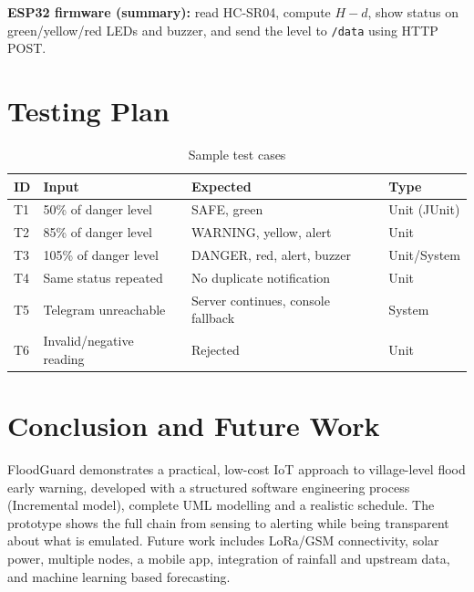 \documentclass[12pt,a4paper]{article}
\begin{document}
\textbf{ESP32 firmware (summary):} read HC-SR04, compute $H-d$, show status on green/yellow/red LEDs and buzzer, and send the level to \texttt{/data} using HTTP POST.

\section{Testing Plan}
\begin{table}[H]\centering\small
\begin{tabular}{@{}lllp{4cm}@{}}\toprule \textbf{ID} & \textbf{Input} & \textbf{Expected} & \textbf{Type}\\\midrule
T1 & 50\% of danger level & SAFE, green & Unit (JUnit)\\
T2 & 85\% of danger level & WARNING, yellow, alert & Unit\\
T3 & 105\% of danger level & DANGER, red, alert, buzzer & Unit/System\\
T4 & Same status repeated & No duplicate notification & Unit\\
T5 & Telegram unreachable & Server continues, console fallback & System\\
T6 & Invalid/negative reading & Rejected & Unit\\\bottomrule
\end{tabular}\caption{Sample test cases}\end{table}

\section{Conclusion and Future Work}
FloodGuard demonstrates a practical, low-cost IoT approach to village-level flood early warning, developed with a structured software engineering process (Incremental model), complete UML modelling and a realistic schedule. The prototype shows the full chain from sensing to alerting while being transparent about what is emulated. Future work includes LoRa/GSM connectivity, solar power, multiple nodes, a mobile app, integration of rainfall and upstream data, and machine learning based forecasting.
\end{document}
